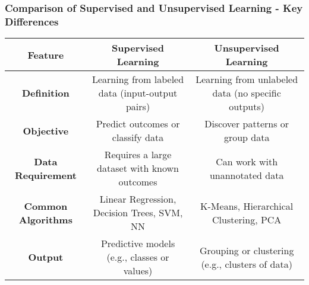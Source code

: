 \documentclass[aspectratio=169]{beamer}
\begin{document}
\begin{frame}[fragile]
    \frametitle{Comparison of Supervised and Unsupervised Learning - Key Differences}
    \begin{table}[ht]
        \centering
        \begin{tabular}{|c|c|c|}
            \hline
            \textbf{Feature} & \textbf{Supervised Learning} & \textbf{Unsupervised Learning} \\
            \hline
            \textbf{Definition} & Learning from labeled data (input-output pairs) & Learning from unlabeled data (no specific outputs) \\
            \hline
            \textbf{Objective} & Predict outcomes or classify data & Discover patterns or group data \\
            \hline
            \textbf{Data Requirement} & Requires a large dataset with known outcomes & Can work with unannotated data \\
            \hline
            \textbf{Common Algorithms} & Linear Regression, Decision Trees, SVM, NN & K-Means, Hierarchical Clustering, PCA \\
            \hline
            \textbf{Output} & Predictive models (e.g., classes or values) & Grouping or clustering (e.g., clusters of data) \\
            \hline
        \end{tabular}
    \end{table}
\end{frame}
\end{document}

